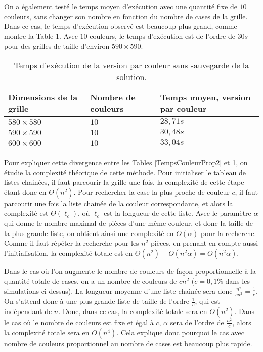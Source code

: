 \documentclass[a4paper,12pt]{article}
\numberwithin{equation}{section}
\begin{document}
On a également testé le temps moyen d'exécution avec une quantité fixe de $10$ couleurs, sans changer son nombre en fonction du nombre de cases de la grille. Dans ce cas, le temps d'exécution observé est beaucoup plus grand, comme montre la Table \ref{TempsCouleurCst}. Avec $10$ couleurs, le temps d'exécution est de l'ordre de $30 s$ pour des grilles de taille d'environ $590 \times 590$.

\begin{table}[ht]
\centering
\begin{tabular}{>{\centering} m{} >{\centering} m{} >{\centering} m{}}
\hline\hline
Dimensions de la grille & Nombre de couleurs & Temps moyen, version par couleur \tabularnewline
\hline
$580 \times 580$ & $10$ & $28,71 s$ \tabularnewline
$590 \times 590$ & $10$ & $30,48 s$ \tabularnewline
$600 \times 600$ & $10$ & $33,04 s$ \tabularnewline
\hline\hline
\end{tabular}
\caption{Temps d'exécution de la version par couleur sans sauvegarde de la solution.}
\label{TempsCouleurCst}
\end{table}

Pour expliquer cette divergence entre les Tables \ref{TempsCouleurProp2} et \ref{TempsCouleurCst}, on étudie la complexité théorique de cette méthode. Pour initialiser le tableau de listes chainées, il faut parcourir la grille une fois, la complexité de cette étape étant donc en $\Theta(n^2)$. Pour rechercher la case la plus proche de couleur $c$, il faut parcourir une fois la liste chainée de la couleur correspondante, et alors la complexité est $\Theta(\ell_c)$, où $\ell_c$ est la longueur de cette liste. Avec le paramètre $\alpha$ qui donne le nombre maximal de pièces d'une même couleur, et donc la taille de la plus grande liste, on obtient ainsi une complexité en $O(\alpha)$ pour la recherche. Comme il faut répéter la recherche pour les $n^2$ pièces, en prenant en compte aussi l'initialisation, la complexité totale est en $\Theta(n^2) + O(n^2 \alpha) = O(n^2 \alpha)$.

Dans le cas où l'on augmente le nombre de couleurs de façon proportionnelle à la quantité totale de cases, on a un nombre de couleurs de $c n^2$ ($c = 0,1\%$ dans les simulations ci-dessus). La longueur moyenne d'une liste chainée sera donc $\frac{n^2}{c n^2} = \frac{1}{c}$. On s'attend donc à une plus grande liste de taille de l'ordre $\frac{1}{c}$, qui est indépendant de $n$. Donc, dans ce cas, la complexité totale sera en $O(n^2)$. Dans le cas où le nombre de couleurs est fixe et égal à $c$, $\alpha$ sera de l'ordre de $\frac{n^2}{c}$, alors la complexité totale sera en $O(n^4)$. Cela explique donc pourquoi le cas avec nombre de couleurs proportionnel au nombre de cases est beaucoup plus rapide.
\end{document}
